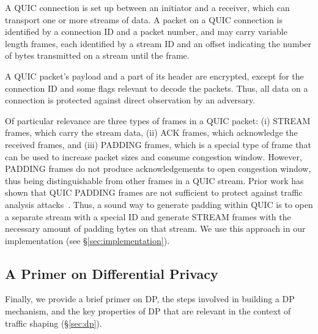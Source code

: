 A QUIC connection is set up between an initiator and a receiver, which can
transport one or more streams of data. A packet on a QUIC connection is
identified by a connection ID and a packet number, and may
carry variable length frames, each identified by a stream ID and an offset
indicating the number of bytes transmitted on a stream until the frame.

A QUIC packet's payload and a part of its header are encrypted, except
for the connection ID and some flags relevant to decode the packets. Thus, all
data on a connection is protected against direct observation
by an adversary.

Of particular relevance are three types of frames in a QUIC packet: (i) STREAM
frames, which carry the stream data, (ii) ACK frames, which acknowledge the
received frames, and (iii) PADDING frames, which is a special type of frame that
can be used to increase packet sizes and consume congestion window. However,
PADDING frames do not produce acknowledgements to open congestion window, thus
being distinguishable from other frames in a QUIC stream. Prior work has shown
that QUIC PADDING frames are not sufficient to protect against traffic analysis
attacks~\cite{siby2022yougetpadding}. Thus, a sound way to generate padding within
QUIC is to open a separate stream with a special ID and generate STREAM frames
with the necessary amount of padding bytes on that stream. We use this approach
in our implementation (see \S\ref{sec:implementation}).
%
\fi

\subsection{A Primer on Differential Privacy}
\label{subsec:DP-background}

{Finally, we provide a brief primer on DP, the steps
involved in building a DP mechanism, and the key properties of DP that are
relevant in the context of traffic shaping (\S\ref{sec:dp}).}

